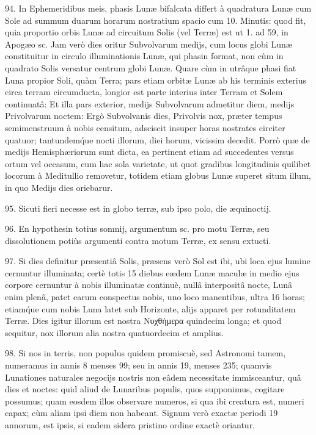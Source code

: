 \documentclass[a4paper, 11pt, oneside, polutonikogreek, german]{article}
\begin{document}
94. In Ephemeridibus meis, phasis Lunæ bifalcata differt à quadratura Lunæ cum Sole ad summum duarum horarum nostratium spacio cum 10. Minutis: quod fit, quia proportio orbis Lunæ ad circuitum Solis (vel Terræ) est ut 1. ad 59, in Apogæo sc. Jam verò dies oritur Subvolvarum medijs, cum locus globi Lunæ constituitur in circulo illuminationis Lunæ, qui phasin format, non cùm in quadrato Solis versatur centrum globi Lunæ. Quare cùm in utrâque phasi fiat Luna propior Soli, quàm Terra; pars etiam orbitæ Lunæ ab his terminis exterius circa terram circumducta, longior est parte interius inter Terram et Solem continuatâ: Et illa pars exterior, medijs Subvolvarum admetitur diem, medijs Privolvarum noctem: Ergò Subvolvanis dies, Privolvis nox, præter tempus semimenstruum à nobis censitum, adsciscit insuper horas nostrates circiter quatuor; tantundem\'que nocti illorum, diei horum, vicissim decedit. Porrò quæ de medijs Hemisphæriorum sunt dicta, ea pertinent etiam ad succedentes versus ortum vel occasum, cum hac sola varietate, ut quot gradibus longitudinis quilibet locorum à Meditullio removetur, totidem etiam globus Lunæ superet situm illum, in quo Medijs dies oriebarur.

95. Sicuti fieri necesse est in globo terræ, sub ipso polo, die æquinoctij.

96. En hypothesin totius somnij, argumentum sc. pro motu Terræ, seu dissolutionem potiùs argumenti contra motum Terræ, ex sensu extucti.

97. Si dies definitur præsentiâ Solis, præsens verò Sol est ibi, ubi loca ejus lumine cernuntur illuminata; certè totis 15 diebus eædem Lunæ maculæ in medio ejus corpore cernuntur à nobis illuminatæ continuè, nullâ interpositâ nocte, Lunâ enim plenâ, patet earum conspectus nobis, uno loco manentibus, ultra 16 horas; etiam\'que cum nobis Luna latet sub Horizonte, alijs apparet per rotunditatem Terræ. Dies igitur illorum est nostra Νυχθήμερα quindecim longa; et quod sequitur, nox illorum alia nostra quatuordecim et amplius.

98. Si nos in terris, non populus quidem promiscuè, sed Astronomi tamem, numeramus in annis 8 menses 99; seu in annis 19, menses 235; quamvis Lunationes naturales negocijs nostris non eâdem necessitate immisceantur, quâ dies et noctes: quid aliud de Lunaribus populis, quos supponimus, cogitare possumus; quam eosdem illos observare numeros, si qua ibi creatura est, numeri capax; cùm aliam ipsi diem non habeant. Signum verò exactæ periodi 19 annorum, est ipsis, si eadem sidera pristino ordine exactè oriantur.
\end{document}
